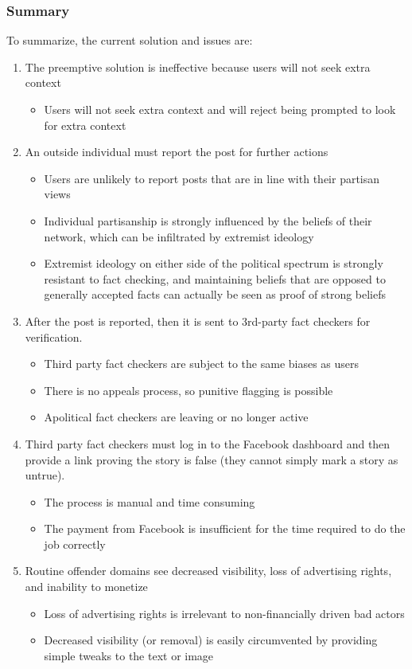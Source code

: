 \documentclass[preprint,review,12pt]{elsarticle}
\begin{document}
\subsubsection{Summary}
To summarize, the current solution and issues are:
\renewcommand{\labelenumii}{\Roman{enumii}}
\begin{enumerate}
\item The preemptive solution is ineffective because users will not seek extra context
\begin{itemize}
\item Users will not seek extra context and will reject being prompted to look for extra context
\end{itemize}
\item An outside individual must report the post for further actions
 \begin{itemize}
     \item Users are unlikely to report posts that are in line with their partisan views
     \item Individual partisanship is strongly influenced by the beliefs of their network, which can be infiltrated by extremist ideology
     \item Extremist ideology on either side of the political spectrum is strongly resistant to fact checking, and maintaining beliefs that are opposed to generally accepted facts can actually be seen as proof of strong beliefs
    \end{itemize}
     \item After the post is reported, then it is  sent to 3rd-party fact checkers for verification. 
     \begin{itemize}
         \item Third party fact checkers are subject to the same biases as users
         \item There is no appeals process, so punitive flagging is possible
         \item Apolitical fact checkers are leaving or no longer active
     \end{itemize}
     \item Third party fact checkers must log in to the Facebook dashboard and then provide a link proving the story is false (they cannot simply mark a story as untrue).
     \begin{itemize}
         \item The process is manual and time consuming
         \item The payment from Facebook is insufficient for the time required to do the job correctly
     \end{itemize}
     \item Routine offender domains see decreased visibility, loss of advertising rights, and inability to monetize
     \begin{itemize}
         \item Loss of advertising rights is irrelevant to non-financially driven bad actors
         \item Decreased visibility (or removal) is easily circumvented by providing simple tweaks to the text or image
     \end{itemize}
 \end{enumerate}
\end{document}
